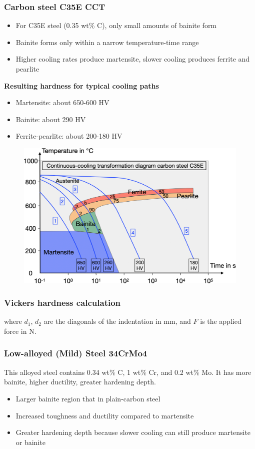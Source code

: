 \documentclass{article}
\begin{document}
\subsubsection{Carbon steel C35E CCT}
\begin{itemize}
  \item For C35E steel (0.35 wt\% C), only small amounts of bainite form
  \item Bainite forms only within a narrow temperature-time range
  \item Higher cooling rates produce martensite, slower cooling produces ferrite and pearlite
\end{itemize}

\textbf{Resulting hardness for typical cooling paths}
\begin{itemize}
  \item Martensite: about 650-600 HV
  \item Bainite: about 290 HV
  \item Ferrite-pearlite: about 200-180 HV
\end{itemize}

\begin{figure}[ht!]
  \centering
  \includegraphics[width=.8\textwidth]{media/CCT_C35E.png}
\end{figure}

\subsubsection{Vickers hardness calculation}

where $d_1$, $d_2$ are the diagonals of the indentation in mm, and $F$ is the applied force in N.

\subsubsection{Low-alloyed (Mild) Steel 34CrMo4}
This alloyed steel contains 0.34 wt\% C, 1 wt\% Cr, and 0.2 wt\% Mo. It has more bainite,
higher ductility, greater hardening depth.
\begin{itemize}
  \item Larger bainite region that in plain-carbon steel
  \item Increased toughness and ductility compared to martensite
  \item Greater hardening depth because slower cooling can still produce martensite or bainite
\end{itemize}
\end{document}
